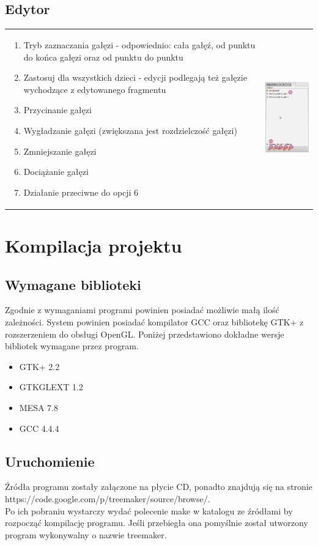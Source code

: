 \subsection{Edytor}
\begin{tabular}{lr}
\parbox[b]{95mm}{
\begin{enumerate}
	\item {Tryb zaznaczania gałęzi - odpowiednio: cała gałęź, od punktu do końca gałęzi oraz od punktu do punktu}
	\item {Zastosuj dla wszystkich dzieci - edycji podlegają też gałęzie wychodzące z edytowanego fragmentu}
	\item {Przycinanie gałęzi}
	\item {Wygładzanie gałęzi (zwiększana jest rozdzielczość gałęzi)}
	\item {Zmniejszanie gałęzi}
	\item {Dociążanie gałęzi}
	\item {Działanie przeciwne do opcji 6}
\end{enumerate}
} &
\includegraphics[width=35mm]{images/gui/editor_panel.png} \\
\end{tabular}

\section{Kompilacja projektu}
\subsection{Wymagane biblioteki}
Zgodnie z wymaganiami programi powinien posiadać możliwie małą ilość zależności. System powinien posiadać kompilator GCC oraz bibliotekę GTK+ z rozszerzeniem do obsługi OpenGL.
Poniżej przedstawiono dokładne wersje bibliotek wymagane przez program.
\begin{itemize}
\item GTK+ 2.2
\item GTKGLEXT 1.2
\item MESA 7.8
\item GCC 4.4.4
\end{itemize}
\subsection{Uruchomienie}
Źródła programu zostały załączone na płycie CD, ponadto znajdują się na stronie https://code.google.com/p/treemaker/source/browse/.\\
Po ich pobraniu wystarczy wydać polecenie make w katalogu ze źródłami by rozpocząć kompilację programu. Jeśli przebiegła ona pomyślnie został utworzony
program wykonywalny o nazwie treemaker.
